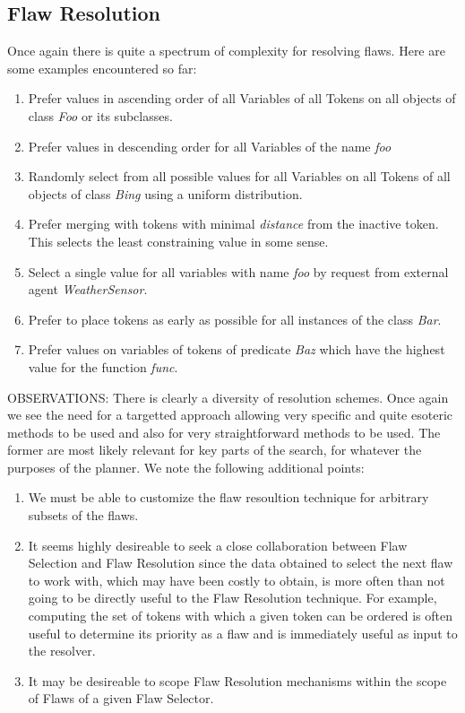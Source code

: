 \documentclass[10pt, letterpaper, twoside]{article}
\begin{document}
\subsection{Flaw Resolution}
Once again there is quite a spectrum of complexity for resolving flaws. Here are some examples encountered so far:
\begin{enumerate}
\item Prefer values in ascending order of all Variables of all Tokens on all objects of class {\em Foo} or its subclasses.
\item Prefer values in descending order for all Variables of the name {\em foo}
\item Randomly select from all possible values for all Variables on all Tokens of all objects of class {\em Bing} using a uniform distribution.
\item Prefer merging with tokens with minimal {\em distance} from the inactive token. This selects the least constraining value in some sense.
\item Select a single value for all variables with name {\em foo} by request from external agent {\em WeatherSensor}.
\item Prefer to place tokens as early as possible for all instances of the class {\em Bar}.
\item Prefer values on variables of tokens of predicate {\em Baz} which have the highest value for the function {\em func}.
\end{enumerate}

OBSERVATIONS: There is clearly a diversity of resolution schemes. Once again we see the need for a targetted approach allowing very specific and quite esoteric methods to be used and also for very straightforward methods to be used. The former are most likely relevant for key parts of the search, for whatever the purposes of the planner. We note the following additional points:
\begin{enumerate}
\item We must be able to customize the flaw resoultion technique for arbitrary subsets of the flaws.
\item It seems highly desireable to seek a close collaboration between Flaw Selection and Flaw Resolution since the data obtained to select the next flaw to work with, which may have been costly to obtain, is more often than not going to be directly useful to the Flaw Resolution technique. For example, computing the set of tokens with which a given token can be ordered is often useful to determine its priority as a flaw and is immediately useful as input to the resolver. 
\item It may be desireable to scope Flaw Resolution mechanisms within the scope of Flaws of a given Flaw Selector.
\end{enumerate}
\end{document}
